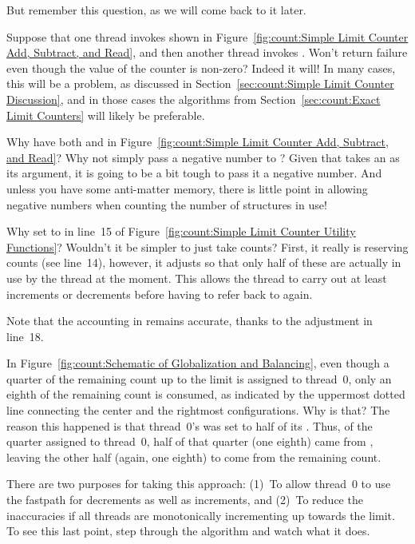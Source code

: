 	But remember this question, as we will come back to it later.

\QuickQ{}
	Suppose that one thread invokes  shown in
	Figure~\ref{fig:count:Simple Limit Counter Add, Subtract, and Read},
	and then another thread invokes .
	Won't  return failure even though the value of
	the counter is non-zero?
\QuickA{}
	Indeed it will!
	In many cases, this will be a problem, as discussed in
	Section~\ref{sec:count:Simple Limit Counter Discussion}, and
	in those cases the algorithms from
	Section~\ref{sec:count:Exact Limit Counters}
	will likely be preferable.

\QuickQ{}
	Why have both  and  in
	Figure~\ref{fig:count:Simple Limit Counter Add, Subtract, and Read}?
	Why not simply pass a negative number to ?
\QuickA{}
	Given that  takes an  
	as its argument, it is going to be a bit tough to pass it a
	negative number.
	And unless you have some anti-matter memory, there is little
	point in allowing negative numbers when counting the number
	of structures in use!

\QuickQ{}
	Why set  to  in line~15 of
	Figure~\ref{fig:count:Simple Limit Counter Utility Functions}?
	Wouldn't it be simpler to just take  counts?
\QuickA{}
	First, it really is reserving  counts
	(see line~14), however,
	it adjusts so that only half of these are actually in use
	by the thread at the moment.
	This allows the thread to carry out at least 
	increments or decrements before having to refer back to
	 again.

	Note that the accounting in  remains accurate,
	thanks to the adjustment in line~18.

\QuickQ{}
	In Figure~\ref{fig:count:Schematic of Globalization and Balancing},
	even though a quarter of the remaining count up to the limit is
	assigned to thread~0, only an eighth of the remaining count is
	consumed, as indicated by the uppermost dotted line connecting
	the center and the rightmost configurations.
	Why is that?
\QuickA{}
	The reason this happened is that thread~0's  was
	set to half of its .
	Thus, of the quarter assigned to thread~0, half of that quarter
	(one eighth) came from , leaving the other half
	(again, one eighth) to come from the remaining count.

	There are two purposes for taking this approach:
	(1)~To allow thread~0 to use the fastpath for decrements as
	well as increments, and
	(2)~To reduce the inaccuracies if all threads are monotonically
	incrementing up towards the limit.
	To see this last point, step through the algorithm and watch
	what it does.

